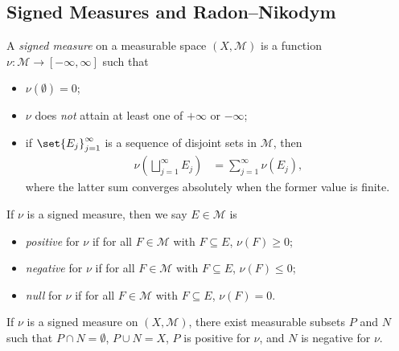 \documentclass[10pt]{mypackage}
\begin{document}
\subsection{Signed Measures and Radon--Nikodym}%
\begin{definition}
  A \textit{signed measure} on a measurable space $\left( X,\mathcal{M} \right)$ is a function $\nu\colon \mathcal{M}\rightarrow [-\infty,\infty]$ such that
  \begin{itemize}
    \item $\nu\left( \emptyset \right) = 0$;
    \item $\nu$ does \textit{not} attain at least one of $+\infty$ or $-\infty$;
    \item if $\set{E_j}_{j=1}^{\infty}$ is a sequence of disjoint sets in $\mathcal{M}$, then
      \begin{align*}
        \nu\left( \bigsqcup_{j=1}^{\infty}E_j \right) &= \sum_{j=1}^{\infty}\nu\left( E_j \right),
      \end{align*}
      where the latter sum converges absolutely when the former value is finite.
  \end{itemize}
\end{definition}
\begin{definition}
  If $\nu$ is a signed measure, then we say $E\in \mathcal{M}$ is
  \begin{itemize}
    \item \textit{positive} for $\nu$ if for all $F\in \mathcal{M}$ with $F\subseteq E$, $\nu\left( F \right) \geq 0$;
    \item \textit{negative} for $\nu$ if for all $F\in \mathcal{M}$ with $F\subseteq E$, $\nu\left( F \right) \leq 0$;
    \item \textit{null} for $\nu$ if for all $F\in \mathcal{M}$ with $F\subseteq E$, $\nu\left( F \right) = 0$.
  \end{itemize}
\end{definition}
\begin{theorem}
  If $\nu$ is a signed measure on $\left( X,\mathcal{M} \right)$, there exist measurable subsets $P$ and $N$ such that $P\cap N = \emptyset$, $P\cup N = X$, $P$ is positive for $\nu$, and $N$ is negative for $\nu$.
\end{theorem}
\end{document}
